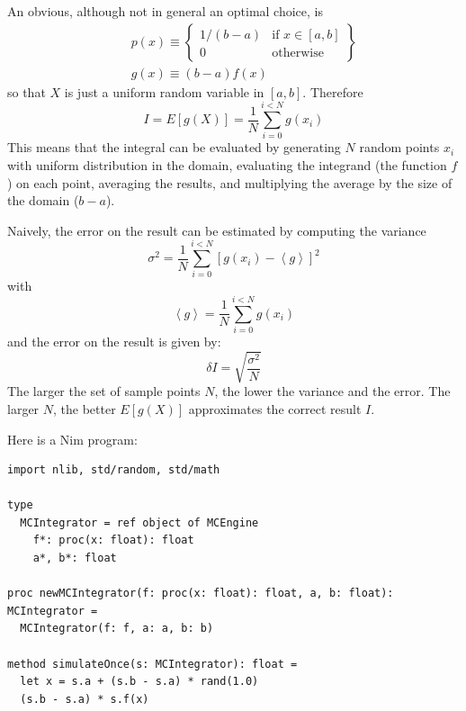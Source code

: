 \documentclass[justified, sixbynine]{tufte-book}
\def\ft{\small\tt}
\theoremstyle{plain}%
\newtheorem * {corollary}{Corollary}
\theoremstyle{definition}
\theoremstyle{remark}
\newtheorem * {remark}{Remark}
\newtheorem * {note}{Note}
\begin{document}
\begin{fullwidth}
An obvious, although not in general an optimal choice, is
\begin{eqnarray}
&&p(x)\equiv \left\{
\begin{array}{ll}
1/(b-a) & \text{if }x\in [a, b] \\
0 & \text{otherwise}
\end{array}
\right\}   \label{defchoice} \\
&&g(x)\equiv (b-a)f(x)  \nonumber
\end{eqnarray}
so that $X$ is just a uniform random variable in $[a, b]$. Therefore
\begin{equation}
I=E\left[ g(X)\right] =\frac1N \sum_{i=0}^{i<N}g(x_i)
\end{equation}
This means that the integral can be evaluated by generating $N$ random
points $x_i$ with uniform distribution in the domain, evaluating the
integrand (the function $f$) on each point, averaging the results, and
multiplying the average by the size of the domain ($b-a$).

Naively, the error on the result can be estimated by computing the variance
\begin{equation}
\sigma ^2 = \frac 1N\sum_{i=0}^{i<N}\left[ g(x_i)-\left\langle
g\right\rangle \right] ^2
\end{equation}
with
\begin{equation}
\left\langle g\right\rangle = \frac 1N\sum_{i=0}^{i<N}g(x_i)
\end{equation}
and the error on the result is given by:
\begin{equation}
\delta I=\sqrt{\frac{\sigma ^2}{N}}
\end{equation}
The larger the set of sample points $N$, the lower the variance and the
error. The larger $N$, the better $E[g(X)]$ approximates the correct result $%
I$.


Here is a Nim program:

\begin{lstlisting}[caption={in file: {\ft integrate.nim}}]
import nlib, std/random, std/math

type
  MCIntegrator = ref object of MCEngine
    f*: proc(x: float): float
    a*, b*: float

proc newMCIntegrator(f: proc(x: float): float, a, b: float): MCIntegrator =
  MCIntegrator(f: f, a: a, b: b)

method simulateOnce(s: MCIntegrator): float =
  let x = s.a + (s.b - s.a) * rand(1.0)
  (s.b - s.a) * s.f(x)


\end{lstlisting}
\end{fullwidth}
\end{document}
